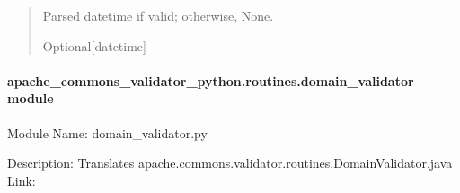 \documentclass[letterpaper,10pt,english]{sphinxmanual}
\begin{document}
\begin{fulllineitems}
\begin{fulllineitems}
\begin{quote}
\begin{description}
\begin{itemize}
\end{itemize}

\sphinxAtStartPar
Parsed datetime if valid; otherwise, None.

\sphinxAtStartPar
Optional{[}datetime{]}

\end{description}\end{quote}

\end{fulllineitems}


\end{fulllineitems}



\paragraph{apache\_commons\_validator\_python.routines.domain\_validator module}
\label{\detokenize{apache_commons_validator_python.routines:module-apache_commons_validator_python.routines.domain_validator}}\label{\detokenize{apache_commons_validator_python.routines:apache-commons-validator-python-routines-domain-validator-module}}
\sphinxAtStartPar
Module Name: domain\_validator.py

\sphinxAtStartPar
Description: Translates apache.commons.validator.routines.DomainValidator.java
Link: 
\end{document}
